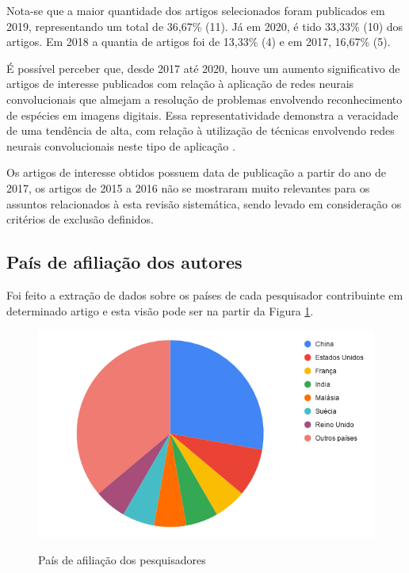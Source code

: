 \documentclass[
	12pt,				%
	oneside,			%
	a4paper,			%
	english,			%
	brazil				%
	]{abntex2ppgsi}
\begin{document}
Nota-se que a maior quantidade dos artigos selecionados foram publicados em 2019, representando um total de 36,67\% (11). Já em 2020, é tido 33,33\% (10) dos artigos. Em 2018 a quantia de artigos foi de 13,33\% (4) e em 2017, 16,67\% (5).

É possível perceber que, desde 2017 até 2020, houve um aumento significativo de artigos de interesse publicados com relação à aplicação de redes neurais convolucionais que almejam a resolução de problemas envolvendo reconhecimento de espécies em imagens digitais. Essa representatividade demonstra a veracidade de uma tendência de alta, com relação à utilização de técnicas envolvendo redes neurais convolucionais neste tipo de aplicação \cite{liu2020classification}.

Os artigos de interesse obtidos possuem data de publicação a partir do ano de 2017, os artigos de 2015 a 2016 não se mostraram muito relevantes para os assuntos relacionados à esta revisão sistemática, sendo levado em consideração os critérios de exclusão definidos.

\subsection{País de afiliação dos autores}
Foi feito a extração de dados sobre os países de cada pesquisador contribuinte em determinado artigo e esta visão pode ser na partir da Figura \ref{fig:grafico_pais_vs_publicacao}.

\begin{figure}[H]
    \centering
    \caption{País de afiliação dos pesquisadores}
    \includegraphics[scale=.60]{imagens/revisao_sistematica/grafico_pais_vs_publicacao.png}
    \label{fig:grafico_pais_vs_publicacao}
\end{figure}
\end{document}
